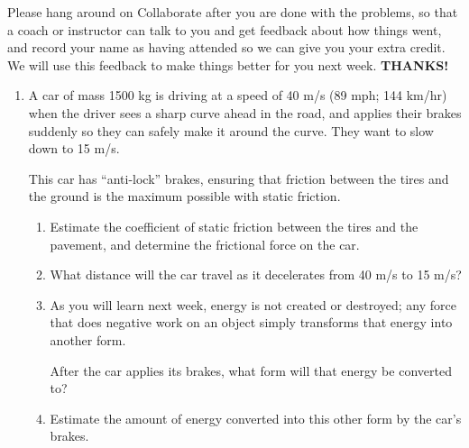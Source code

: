 \documentclass[12pt]{article}
\begin{document}
\Large
\centerline{}
\normalsize
\centerline{}

\bigskip

\it \begin{center} \footnotesize Please hang around on Collaborate after you are done with the problems, so that a coach or instructor can talk to you and get feedback about how things went, and record your name as having attended so we can give you your extra credit. We will use this feedback to make things better for you next week. \bf THANKS! \end{center}
\rm 
{}
\begin{enumerate}

  \item{A car of mass 1500 kg is driving at a speed of 40 m/s (89 mph; 144 km/hr) when the driver sees a sharp curve ahead in the road, and applies their brakes suddenly so they can safely
make it around the curve. They want to slow down to 15 m/s.

This car has ``anti-lock'' brakes, ensuring that friction between
the tires and the ground is the maximum possible with static friction.} 

\begin{enumerate}
\item Estimate the coefficient of static friction between the tires and the pavement, and determine the frictional force on the car.

\vspace{3in}

\item What distance will the car travel as it decelerates from 40 m/s to 15 m/s?
\vspace{3in}
\item As you will learn next week, energy is not created or destroyed; any force that does negative work on an object simply transforms that energy into another form. 



After the car applies its brakes, what form will that energy be converted to? 
\vspace{2in}

\item Estimate the amount of energy converted into this other form by the car's brakes.

\vspace{4in}
\newpage
\end{enumerate} 


\end{enumerate}
\end{document}
